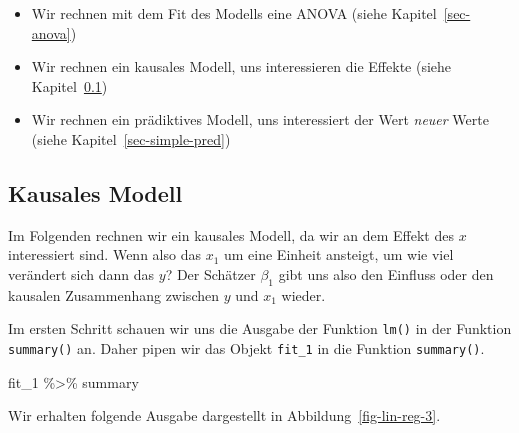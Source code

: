 \documentclass[
  letterpaper,
]{scrbook}
\newenvironment{Shaded}{\begin{snugshade}}{\end{snugshade}}
\newcommand{\NormalTok}[1]{\textcolor[rgb]{0.00,0.23,0.31}{#1}}
\newcommand{\SpecialCharTok}[1]{\textcolor[rgb]{0.37,0.37,0.37}{#1}}
\providecommand{\tightlist}{%
  \setlength{\itemsep}{0pt}\setlength{\parskip}{0pt}}\usepackage{longtable,booktabs,array}
\begin{document}
\begin{itemize}
\tightlist
\item
  Wir rechnen mit dem Fit des Modells eine ANOVA (siehe
  Kapitel~\ref{sec-anova})
\item
  Wir rechnen ein kausales Modell, uns interessieren die Effekte (siehe
  Kapitel~\ref{sec-simple-kausal})
\item
  Wir rechnen ein prädiktives Modell, uns interessiert der Wert
  \emph{neuer} Werte (siehe Kapitel~\ref{sec-simple-pred})
\end{itemize}

\hypertarget{sec-simple-kausal}{%
\subsection{Kausales Modell}\label{sec-simple-kausal}}

Im Folgenden rechnen wir ein kausales Modell, da wir an dem Effekt des
\(x\) interessiert sind. Wenn also das \(x_1\) um eine Einheit ansteigt,
um wie viel verändert sich dann das \(y\)? Der Schätzer \(\beta_1\) gibt
uns also den Einfluss oder den kausalen Zusammenhang zwischen \(y\) und
\(x_1\) wieder.

{}

Im ersten Schritt schauen wir uns die Ausgabe der Funktion \texttt{lm()}
in der Funktion \texttt{summary()} an. Daher pipen wir das Objekt
\texttt{fit\_1} in die Funktion \texttt{summary()}.

\begin{Shaded}
\begin{Highlighting}[]
\NormalTok{fit\_1 }\SpecialCharTok{\%\textgreater{}\%}\NormalTok{ summary}
\end{Highlighting}
\end{Shaded}

Wir erhalten folgende Ausgabe dargestellt in
Abbildung~\ref{fig-lin-reg-3}.
\end{document}
